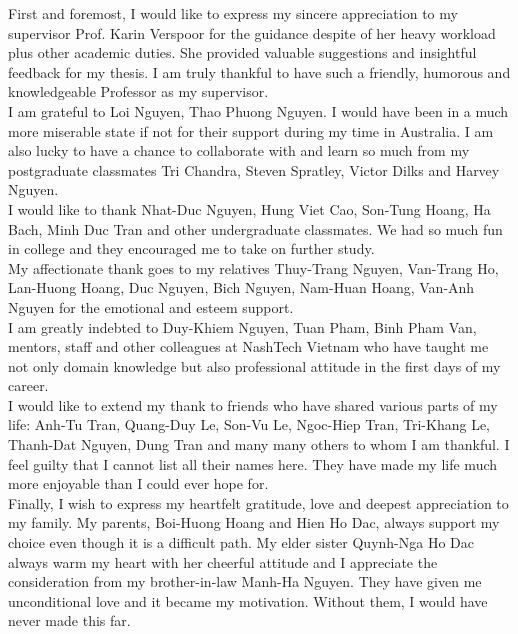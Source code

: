 
\begin{acknowledgements}
First and foremost, I would like to express my sincere appreciation to my supervisor Prof. Karin Verspoor for the guidance despite of her heavy workload plus other academic duties. She provided valuable suggestions and insightful feedback for my thesis. I am truly thankful to have such a friendly, humorous and knowledgeable Professor as my supervisor.\\
I am grateful to Loi Nguyen, Thao Phuong Nguyen. I would have been in a much more miserable state if not for their support during my time in Australia. I am also lucky to have a chance to collaborate with and learn so much from my postgraduate classmates Tri Chandra, Steven Spratley, Victor Dilks and Harvey Nguyen.\\
I would like to thank Nhat-Duc Nguyen, Hung Viet Cao, Son-Tung Hoang, Ha Bach, Minh Duc Tran and other undergraduate classmates. We had so much fun in college and they encouraged me to take on further study.\\
My affectionate thank goes to my relatives Thuy-Trang Nguyen, Van-Trang Ho, Lan-Huong Hoang, Duc Nguyen, Bich Nguyen, Nam-Huan Hoang, Van-Anh Nguyen for the emotional and esteem support.\\
I am greatly indebted to Duy-Khiem Nguyen, Tuan Pham, Binh Pham Van, mentors, staff and other colleagues at NashTech Vietnam who have taught me not only domain knowledge but also professional attitude in the first days of my career.\\
I would like to extend my thank to friends who have shared various parts of my life: Anh-Tu Tran, Quang-Duy Le, Son-Vu Le, Ngoc-Hiep Tran, Tri-Khang Le, Thanh-Dat Nguyen, Dung Tran and many many others to whom I am thankful. I feel guilty that I cannot list all their names here. They have made my life much more enjoyable than I could ever hope for.\\
Finally, I wish to express my heartfelt gratitude, love and deepest appreciation to my family. My parents, Boi-Huong Hoang and Hien Ho Dac, always support my choice even though it is a difficult path. My elder sister Quynh-Nga Ho Dac always warm my heart with her cheerful attitude and I appreciate the consideration from my brother-in-law Manh-Ha Nguyen. They have given me unconditional love and it became my motivation. Without them, I would have never made this far.\\

\end{acknowledgements}
